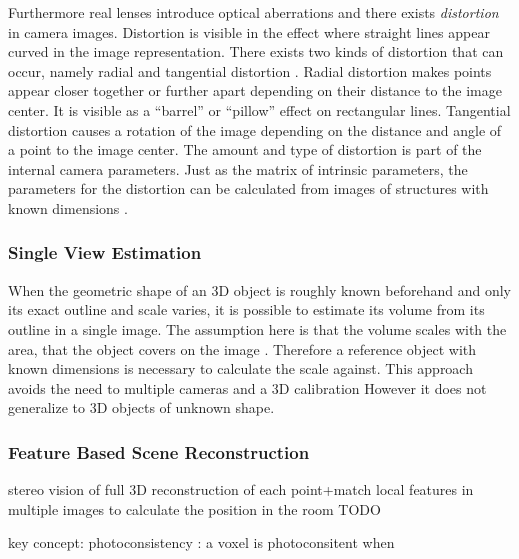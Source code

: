 Furthermore real lenses introduce optical aberrations and 
there exists \emph{distortion} in camera images.
Distortion is visible in the effect where straight lines appear curved in the image representation.
There exists two kinds of distortion that can occur, namely radial and tangential distortion \autocite[][Fig.~2]{weng1992distortion}.
Radial distortion makes points appear closer together or further apart depending on their distance to the image center. 
It is visible as a \enquote{barrel} or \enquote{pillow} effect on rectangular lines. 
Tangential distortion causes a rotation of the image depending on the distance and angle of a point to the image center.
The amount and type of distortion is part of the internal camera parameters.
Just as the matrix of intrinsic parameters, the parameters for the distortion can be calculated from images of structures with known dimensions
\autocite{opencv2018calibration}.

\subsubsection{Single View Estimation}
When the geometric shape of an \ac{3D} object is roughly known beforehand and only its exact outline and scale varies, it is possible to estimate its volume from its outline in a single image.
The assumption here is that the volume scales with the area, that the object covers on the image \autocite{levine1989microwave} \autocite[][]{wang2017apple} \autocite[][]{sapkal2017volume} .
Therefore a reference object with known dimensions is necessary to calculate the scale against.
This approach avoids the need to multiple cameras and a \ac{3D} calibration
However it does not generalize to \ac{3D} objects of unknown shape.

\subsubsection{Feature Based Scene Reconstruction} 
stereo vision
of full \ac{3D} reconstruction of each point+match local features in multiple images to calculate the position in the room
TODO

key concept: photoconsistency : a voxel is photoconsitent when 




